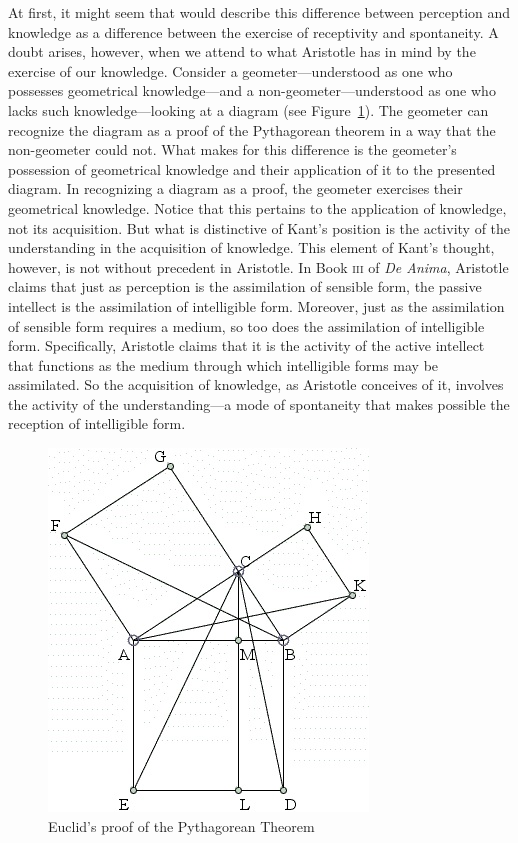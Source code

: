 At first, it might seem that \citet{Kant:1781fk} would describe this difference between perception and knowledge as a difference between the exercise of receptivity and spontaneity. A doubt arises, however, when we attend to what Aristotle has in mind by the exercise of our knowledge. Consider a geometer---understood as one who possesses geometrical knowledge---and a non-geo\-me\-ter\----understood as one who lacks such knowledge---looking at a diagram (see Figure~\ref{fig:1.5}). The geometer can recognize the diagram as a proof of the Pythagorean theorem in a way that the non-geometer could not. What makes for this difference is the geometer's possession of geometrical knowledge and their application of it to the presented diagram. In recognizing a diagram as a proof, the geometer exercises their geometrical knowledge. Notice that this pertains to the application of knowledge, not its acquisition. But what is distinctive of Kant's position is the activity of the understanding in the acquisition of knowledge. This element of Kant's thought, however, is not without precedent in Aristotle. In Book \textsc{iii} of \emph{De Anima}, Aristotle claims that just as perception is the assimilation of sensible form, the passive intellect is the assimilation of intelligible form. Moreover, just as the assimilation of sensible form requires a medium, so too does the assimilation of intelligible form. Specifically, Aristotle claims that it is the activity of the active intellect that functions as the medium through which intelligible forms may be assimilated. So the acquisition of knowledge, as Aristotle conceives of it, involves the activity of the understanding---a mode of spontaneity that makes possible the reception of intelligible form.

\begin{figure}[htbp]
    \centering
        \includegraphics[scale=.55]{graphics/euclid.jpg}
    \caption{Euclid's proof of the Pythagorean Theorem}
    \label{fig:1.5}
\end{figure}


